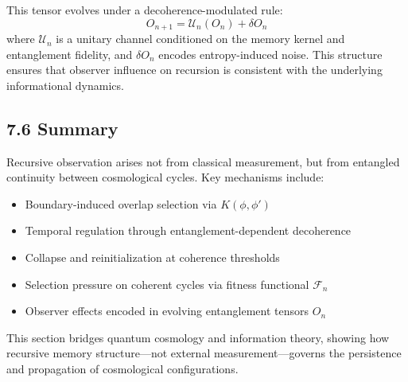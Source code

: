 This tensor evolves under a decoherence-modulated rule:
\[
O_{n+1} = \mathcal{U}_n(O_n) + \delta O_n
\]
where \( \mathcal{U}_n \) is a unitary channel conditioned on the memory kernel and entanglement fidelity, and \( \delta O_n \) encodes entropy-induced noise. This structure ensures that observer influence on recursion is consistent with the underlying informational dynamics.

\subsection{7.6 Summary}

Recursive observation arises not from classical measurement, but from entangled continuity between cosmological cycles. Key mechanisms include:

\begin{itemize}
    \item Boundary-induced overlap selection via \( K(\phi, \phi') \)
    \item Temporal regulation through entanglement-dependent decoherence
    \item Collapse and reinitialization at coherence thresholds
    \item Selection pressure on coherent cycles via fitness functional \( \mathcal{F}_n \)
    \item Observer effects encoded in evolving entanglement tensors \( O_n \)
\end{itemize}

This section bridges quantum cosmology and information theory, showing how recursive memory structure—not external measurement—governs the persistence and propagation of cosmological configurations.
